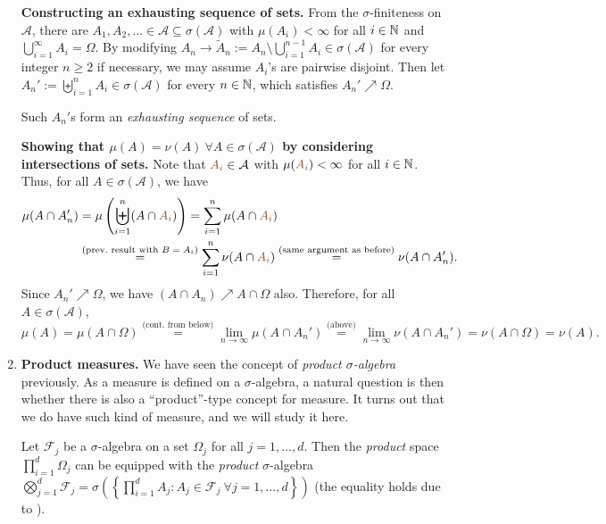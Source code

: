 \begin{enumerate}
\begin{pf}
\textbf{Constructing an exhausting sequence of sets.}
From the \(\sigma\)-finiteness on \(\mathcal{A}\), there are
\(A_1,A_2,\dotsc\in\mathcal{A}\subseteq\sigma(\mathcal{A})\) with
\(\mu(A_i)<\infty\) for all \(i\in\mathbb{N}\) and
\(\bigcup_{i=1}^{\infty}A_i=\Omega\). By modifying \(A_n\to
\widetilde{A}_n:=A_n\setminus \bigcup_{i=1}^{n-1}A_i\in\sigma(\mathcal{A})\)
for every integer \(n\ge 2\) if necessary, we may assume \(A_i\)'s are pairwise
disjoint. Then let \(A_n':=\biguplus_{i=1}^{n}A_i\in\sigma(\mathcal{A})\) for
every \(n\in\mathbb{N}\), which satisfies \(A_n'\nearrow \Omega\).
\begin{note}
Such \(A_n'\)s form an \emph{exhausting sequence} of sets.
\end{note}

\textbf{Showing that \(\mu(A)=\nu(A)~\forall A\in\sigma(\mathcal{A})\) by
considering intersections of sets.}
Note that \(\brc{A_i}\in\mathcal{A}\) with \(\mu(\brc{A_i})<\infty\) for all
\(i\in\mathbb{N}\). Thus, for all \(A\in\sigma(\mathcal{A})\), we have
\begin{align*}
\mu(A\cap A_n')
&=\mu\left(\biguplus_{i=1}^{n}(A\cap \brc{A_i})\right)
=\sum_{i=1}^{n}\mu(A\cap \brc{A_i}) \\
&\overset{\text{(prev.~result with \(B=A_i\))}}{=}\sum_{i=1}^{n}\nu(A\cap\brc{A_i})
\overset{\text{(same argument as before)}}{=}\nu(A\cap A_n').
\end{align*}
Since \(A_n'\nearrow\Omega\), we have \((A\cap A_n)\nearrow A\cap\Omega\) also.
Therefore, for all \(A\in\sigma(\mathcal{A})\),
\[
\mu(A)=\mu(A\cap\Omega)
\overset{\text{(cont.~from below)}}{=}\lim_{n\to\infty}\mu(A\cap A_n')
\overset{\text{(above)}}{=}\lim_{n\to\infty}\nu(A\cap A_n')
=\nu(A\cap\Omega)
=\nu(A).
\]
\end{pf}
\item \textbf{Product measures.} We have seen the concept of \emph{product
\(\sigma\)-algebra} previously. As a measure is defined on a
\(\sigma\)-algebra, a natural question is then whether there is also a
``product''-type concept for measure. It turns out that we do have such kind of
measure, and we will study it here.

Let \(\mathcal{F}_j\) be a \(\sigma\)-algebra on a set \(\Omega_j\) for all
\(j=1,\dotsc,d\). Then the \emph{product} space \(\prod_{i=1}^{d}\Omega_j\) can
be equipped with the \emph{product} \(\sigma\)-algebra
\(\bigotimes_{j=1}^{d}\mathcal{F}_j=\sigma\left(\left\{\prod_{i=1}^{d}A_j:A_j\in\mathcal{F}_j~\forall
j=1,\dotsc,d\right\}\right)\) (the equality holds due to
).


\end{enumerate}
